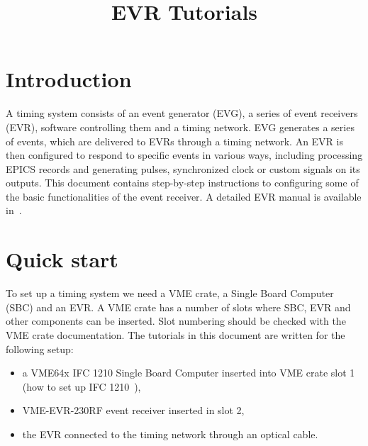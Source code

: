 \documentclass[12pt,a4paper]{article}
\title{EVR Tutorials}
\begin{document}
\maketitle

\tableofcontents
\newpage

\section{Introduction}
A timing system consists of an event generator (EVG), a series of event receivers (EVR), software controlling them and a timing network. EVG generates a series of events, which are delivered to EVRs through a timing network. An EVR is then configured to respond to specific events in various ways, including processing EPICS records and generating pulses, synchronized clock or custom signals on its outputs.
This document contains step-by-step instructions to configuring some of the basic functionalities of the event receiver. A detailed EVR manual is available in~\cite{evr_manual}.

\section{Quick start}\label{sec:Quick start}
To set up a timing system we need a VME crate, a Single Board Computer (SBC) and an EVR. A VME crate has a number of slots where SBC, EVR and other components can be inserted. Slot numbering should be checked with the VME crate documentation. The tutorials in this document are written for the following setup:
\begin{itemize}
	 \item a VME64x IFC 1210 Single Board Computer inserted into VME crate slot 1 (how to set up IFC 1210~\cite{ifc}),
	\item VME-EVR-230RF event receiver inserted in slot 2,
	\item the EVR connected to the timing network through an optical cable.
\end{itemize}
\end{document}
